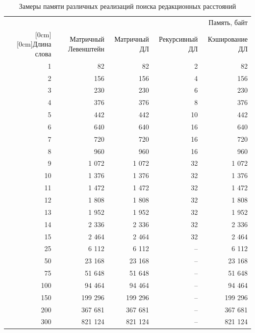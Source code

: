 \begin{table}[H]
	\centering
	\footnotesize
	\caption{\label{table:mem} Замеры памяти различных реализаций поиска редакционных расстояний}
	\begin{center}
		\begin{tabular}{|r|r|r|r|r|}
			\hline
			& \multicolumn{4}{r|}{Память, байт} \\
			\cline{2-5}
			\raisebox{1.5ex}[0cm][0cm]{Длина слова}
			& Матричный Левенштейн & Матричный ДЛ & Рекурсивный ДЛ & Кэширование ДЛ \\
			\hline
			1 & 82 & 82 & 2 & 82 \\ \hline
			2 & 156 & 156 & 4 & 156 \\ \hline
			3 & 230 & 230 & 6 & 230 \\ \hline
			4 & 376 & 376 & 8 & 376 \\ \hline
			5 & 442 & 442 & 10 & 442 \\ \hline
			6 & 640 & 640 & 16 & 640 \\ \hline
			7 & 720 & 720 & 16 & 720 \\ \hline
			8 & 960 & 960 & 16 & 960 \\ \hline
			9 & 1 072 & 1 072 & 32 & 1 072 \\ \hline
			10 & 1 376 & 1 376 & 32 & 1 376 \\ \hline
			11 & 1 472 & 1 472 & 32 & 1 472 \\ \hline
			12 & 1 808 & 1 808 & 32 & 1 808 \\ \hline
			13 & 1 952 & 1 952 & 32 & 1 952 \\ \hline
			14 & 2 336 & 2 336 & 32 & 2 336 \\ \hline
			15 & 2 464 & 2 464 & 32 & 2 464 \\ \hline
			25 & 6 112 & 6 112 & -- & 6 112 \\ \hline
			50 & 23 168 & 23 168 & -- & 23 168 \\ \hline
			75 & 51 648 & 51 648 & -- & 51 648 \\ \hline
			100 & 94 464 & 94 464 & -- & 94 464 \\ \hline
			150 & 199 296 & 199 296 & -- & 199 296 \\ \hline
			200 & 367 681 & 367 681 & -- & 367 681 \\ \hline
			300 & 821 124 & 821 124 & -- & 821 124 \\ \hline
		\end{tabular}
	\end{center}
\end{table}

